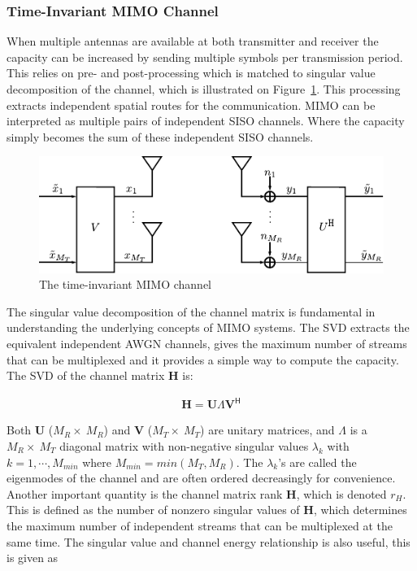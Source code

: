 \subsubsection{Time-Invariant MIMO Channel}
When multiple antennas are available at both transmitter and receiver the capacity can be increased by sending multiple symbols per transmission period. This relies on pre- and post-processing which is matched to singular value decomposition of the channel, which is illustrated on Figure~\ref{fig:mimoModel}. This processing extracts independent spatial routes for the communication. MIMO can be interpreted as multiple pairs of independent SISO channels. Where the capacity simply becomes the sum of these independent SISO channels. 
\begin{figure}[htbp]
  \centering
  \includegraphics[scale=1.2]{img/analysis/mimoModel}
  \caption{The time-invariant MIMO channel}
  \label{fig:mimoModel}
\end{figure}
The singular value decomposition of the channel matrix is fundamental in understanding the underlying concepts of MIMO systems. The SVD extracts the equivalent independent AWGN channels, gives the maximum number of streams that can be multiplexed and it provides a simple way to compute the capacity. The SVD of the channel matrix $\mathbf{H}$ is: 

\begin{align*}
  \mathbf{H} = \mathbf{U} \Lambda \mathbf{V}^{\mathsf{H}} 
\end{align*}
 
Both $\mathbf{U}$ ($M_R \times \ M_R$) and $\mathbf{V}$ ($M_T \times \ M_T$) are unitary matrices, and $\Lambda$ is a  $M_R \times \ M_T$ diagonal matrix with non-negative singular values $\lambda_k$ with $k=1, \cdots, M_{min}$ where $M_{min} = min(M_T,M_R)$. The $\lambda_k$'s are called the eigenmodes of the channel and are often ordered decreasingly for convenience.
Another important quantity is the channel matrix rank $\mathbf{H}$, which is denoted $r_H$. This is defined as the number of nonzero singular values of $\mathbf{H}$, which determines the maximum number of independent streams that can be multiplexed at the same time. The singular value and channel energy relationship is also useful, this is given as 

